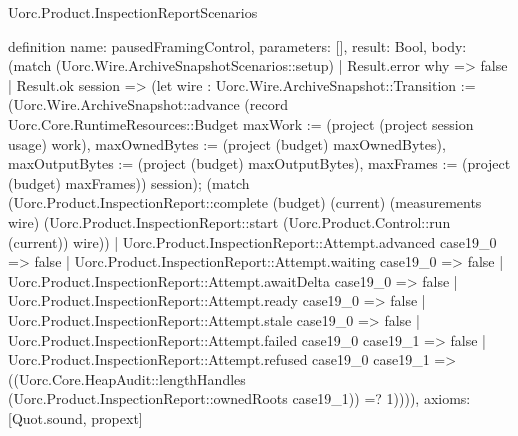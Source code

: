 \begin{lexlean}{Uorc.Product.InspectionReportScenarios}
\begin{semanticmodule}
definition{
  name: pausedFramingControl,
  parameters: [],
  result: Bool,
  body: (match (Uorc.Wire.ArchiveSnapshotScenarios::setup)
    | Result.error why => false
    | Result.ok session => (let wire : Uorc.Wire.ArchiveSnapshot::Transition := (Uorc.Wire.ArchiveSnapshot::advance (record Uorc.Core.RuntimeResources::Budget {maxWork := (project (project session usage) work), maxOwnedBytes := (project (budget) maxOwnedBytes), maxOutputBytes := (project (budget) maxOutputBytes), maxFrames := (project (budget) maxFrames)}) session); (match (Uorc.Product.InspectionReport::complete (budget) (current) (measurements wire) (Uorc.Product.InspectionReport::start (Uorc.Product.Control::run (current)) wire))
      | Uorc.Product.InspectionReport::Attempt.advanced case19_0 => false
      | Uorc.Product.InspectionReport::Attempt.waiting case19_0 => false
      | Uorc.Product.InspectionReport::Attempt.awaitDelta case19_0 => false
      | Uorc.Product.InspectionReport::Attempt.ready case19_0 => false
      | Uorc.Product.InspectionReport::Attempt.stale case19_0 => false
      | Uorc.Product.InspectionReport::Attempt.failed case19_0 case19_1 => false
      | Uorc.Product.InspectionReport::Attempt.refused case19_0 case19_1 => ((Uorc.Core.HeapAudit::lengthHandles (Uorc.Product.InspectionReport::ownedRoots case19_1)) =? 1)))),
  axioms: [Quot.sound, propext]
}


\end{semanticmodule}
\end{lexlean}
